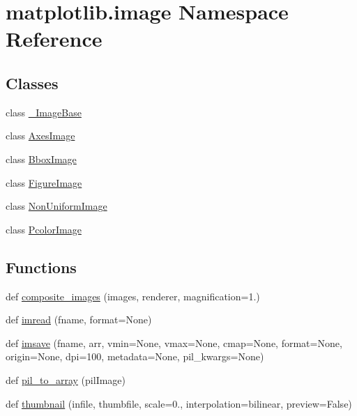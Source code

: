\hypertarget{namespacematplotlib_1_1image}{}\section{matplotlib.\+image Namespace Reference}
\label{namespacematplotlib_1_1image}
\subsection*{Classes}
\begin{DoxyCompactItemize}
\item 
class \hyperlink{classmatplotlib_1_1image_1_1__ImageBase}{\+\_\+\+Image\+Base}
\item 
class \hyperlink{classmatplotlib_1_1image_1_1AxesImage}{Axes\+Image}
\item 
class \hyperlink{classmatplotlib_1_1image_1_1BboxImage}{Bbox\+Image}
\item 
class \hyperlink{classmatplotlib_1_1image_1_1FigureImage}{Figure\+Image}
\item 
class \hyperlink{classmatplotlib_1_1image_1_1NonUniformImage}{Non\+Uniform\+Image}
\item 
class \hyperlink{classmatplotlib_1_1image_1_1PcolorImage}{Pcolor\+Image}
\end{DoxyCompactItemize}
\subsection*{Functions}
\begin{DoxyCompactItemize}
\item 
def \hyperlink{namespacematplotlib_1_1image_a3b7ffb382d966856338cedc8ced3a15d}{composite\+\_\+images} (images, renderer, magnification=1.)
\item 
def \hyperlink{namespacematplotlib_1_1image_a31944ffacf7bad0c380b9d4708c9b770}{imread} (fname, format=None)
\item 
def \hyperlink{namespacematplotlib_1_1image_a3937a6644e227cd804a36cfe4e9969e7}{imsave} (fname, arr, vmin=None, vmax=None, cmap=None, format=None, origin=None, dpi=100, metadata=None, pil\+\_\+kwargs=None)
\item 
def \hyperlink{namespacematplotlib_1_1image_a989574f28f8a0552ce1d17bf89493c92}{pil\+\_\+to\+\_\+array} (pil\+Image)
\item 
def \hyperlink{namespacematplotlib_1_1image_a7d35eeb8c37e2a731eed617339d3d831}{thumbnail} (infile, thumbfile, scale=0., interpolation=\textquotesingle{}bilinear\textquotesingle{}, preview=False)
\end{DoxyCompactItemize}
